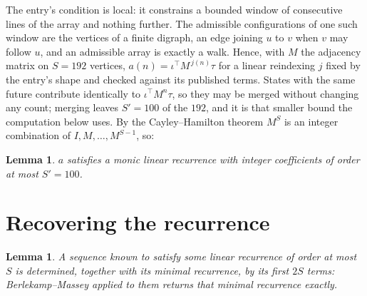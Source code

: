 \documentclass[11pt,a4paper]{article}
\theoremstyle{plain}
\newtheorem{lemma}[theorem]{Lemma}
\theoremstyle{definition}
\begin{document}
The entry's condition is local: it constrains a bounded window of consecutive lines of the
array and nothing further. The admissible configurations of one such window are the vertices
of a finite digraph, an edge joining $u$ to $v$ when $v$ may follow $u$, and an admissible
array is exactly a walk. Hence, with $M$ the adjacency matrix on $S=192$ vertices,
$a(n)=\iota^{\!\top}M^{\,j(n)}\tau$ for a linear reindexing $j$ fixed by the entry's shape
and checked against its published terms. States with the same future contribute identically to $\iota^{\!\top}M^n\tau$, so they may be merged without changing any count; merging leaves $S'=100$ of the $192$, and it is that smaller bound the computation below uses. By the Cayley--Hamilton theorem $M^{S}$ is an
integer combination of $I,M,\dots,M^{S-1}$, so:

\begin{lemma}\label{lem:cf}
$a$ satisfies a monic linear recurrence with integer coefficients of order at most
$S'=100$.
\end{lemma}

\section{Recovering the recurrence}

\begin{lemma}\label{lem:bm}
A sequence known to satisfy some linear recurrence of order at most $S$ is determined, together
with its minimal recurrence, by its first $2S$ terms: Berlekamp--Massey applied to them returns
that minimal recurrence exactly.
\end{lemma}
\end{document}
